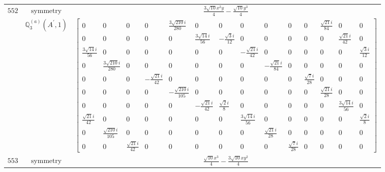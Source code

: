 \documentclass[fleqn,8pt,landscape]{jsarticle}
\begin{document}
\begin{longtable}{ccc}
$ 552 $ & $ \text{symmetry} $ & $ \frac{3 \sqrt{10} x^{2} y}{4} - \frac{\sqrt{10} y^{3}}{4} $ \\
$  $ & $ \mathbb{Q}_{3}^{(a)}(A^{\prime},1) $ & $ \begin{bmatrix} 0 & 0 & 0 & 0 & \frac{3 \sqrt{210} i}{280} & 0 & 0 & 0 & 0 & 0 & 0 & \frac{\sqrt{21} i}{84} & 0 & 0 \\ 0 & 0 & 0 & 0 & 0 & \frac{3 \sqrt{14} i}{56} & - \frac{\sqrt{3} i}{12} & 0 & 0 & 0 & 0 & 0 & \frac{\sqrt{21} i}{42} & 0 \\ \frac{3 \sqrt{14} i}{56} & 0 & 0 & 0 & 0 & 0 & 0 & - \frac{\sqrt{21} i}{42} & 0 & 0 & 0 & 0 & 0 & \frac{\sqrt{3} i}{12} \\ 0 & \frac{3 \sqrt{210} i}{280} & 0 & 0 & 0 & 0 & 0 & 0 & - \frac{\sqrt{21} i}{84} & 0 & 0 & 0 & 0 & 0 \\ 0 & 0 & 0 & - \frac{\sqrt{21} i}{42} & 0 & 0 & 0 & 0 & 0 & 0 & \frac{\sqrt{7} i}{28} & 0 & 0 & 0 \\ 0 & 0 & 0 & 0 & - \frac{\sqrt{210} i}{105} & 0 & 0 & 0 & 0 & 0 & 0 & \frac{\sqrt{21} i}{28} & 0 & 0 \\ 0 & 0 & 0 & 0 & 0 & - \frac{\sqrt{21} i}{42} & \frac{\sqrt{2} i}{8} & 0 & 0 & 0 & 0 & 0 & \frac{3 \sqrt{14} i}{56} & 0 \\ \frac{\sqrt{21} i}{42} & 0 & 0 & 0 & 0 & 0 & 0 & \frac{3 \sqrt{14} i}{56} & 0 & 0 & 0 & 0 & 0 & \frac{\sqrt{2} i}{8} \\ 0 & \frac{\sqrt{210} i}{105} & 0 & 0 & 0 & 0 & 0 & 0 & \frac{\sqrt{21} i}{28} & 0 & 0 & 0 & 0 & 0 \\ 0 & 0 & \frac{\sqrt{21} i}{42} & 0 & 0 & 0 & 0 & 0 & 0 & \frac{\sqrt{7} i}{28} & 0 & 0 & 0 & 0 \end{bmatrix} $ \\ \hline
$ 553 $ & $ \text{symmetry} $ & $ \frac{\sqrt{10} x^{3}}{4} - \frac{3 \sqrt{10} x y^{2}}{4} $ \\

\end{longtable}
\end{document}
